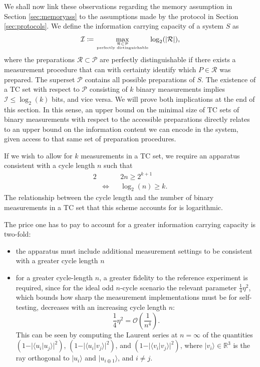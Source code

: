 We shall now link these observations regarding the memory assumption in Section \ref{sec:memoryass} to the assumptions made by the protocol in Section \ref{sec:protocols}.
We define the information carrying capacity of a system $S$ as 
\begin{equation*}
\mathcal{I}\coloneqq \max_{\mathcal{R}\subset \mathcal{P}\atop\text{perfectly distinguishable}}\log_2(\vert \mathcal{R} \vert),
\end{equation*}
where the preparations $\mathcal{R}\subset\mathcal{P}$ are perfectly distinguishable if there exists a measurement procedure that can with certainty identify which $P\in\mathcal{R}$ was prepared. The superset $\mathcal{P}$ contains all possible preparations of $S$.
The existence of a TC set with respect to $\mathcal{P}$ consisting of $k$ binary measurements implies $\mathcal{I} \leq \log_2(k)$ bits, and vice versa. We will prove both implications at the end of this section. In this sense, an upper bound on the minimal size of TC sets of binary measurements with respect to the accessible preparations directly relates to an upper bound on the information content we can encode in the system, given access to that same set of preparation procedures. 

If we wish to allow for $k$ measurements in a TC set, we require an apparatus consistent with a cycle length $n$ such that
\begin{alignat*}{2}
& && 2n\geq 2^{k+1} \\
& \iff && \log_2(n)\geq k.
\end{alignat*}
The relationship between the cycle length and the number of binary measurements in a TC set that this scheme accounts for is logarithmic.

The price one has to pay to account for a greater information carrying capacity is two-fold:
\begin{itemize}
\item the apparatus must include additional measurement settings to be consistent with a greater cycle length $n$
\item for a greater cycle-length $n$, a greater fidelity to the reference experiment is required, since for the ideal odd $n$-cycle scenario the relevant parameter $\frac{1}{4}\eta^2$, which bounds how sharp the measurement implementations must be for self-testing, decreases with an increasing cycle length $n$:
\begin{equation*}
\frac{1}{4}\eta^2 = \mathcal{O}\left(\frac{1}{n^4}\right).
\end{equation*}
This can be seen by computing the Laurent series at $n=\infty$ of the quantities $(1-\vert\langle u_i\vert u_j \rangle\vert^2)$, $(1-\vert\langle u_i\vert v_j \rangle\vert^2)$, and $(1-\vert\langle v_i\vert v_j \rangle\vert^2)$, where $\vert v_i \rangle\in\mathbb{R}^3$ is the ray orthogonal to $\vert u_i\rangle$ and $\vert u_{i\oplus 1}\rangle$, and $i\neq j$.
\end{itemize} 

